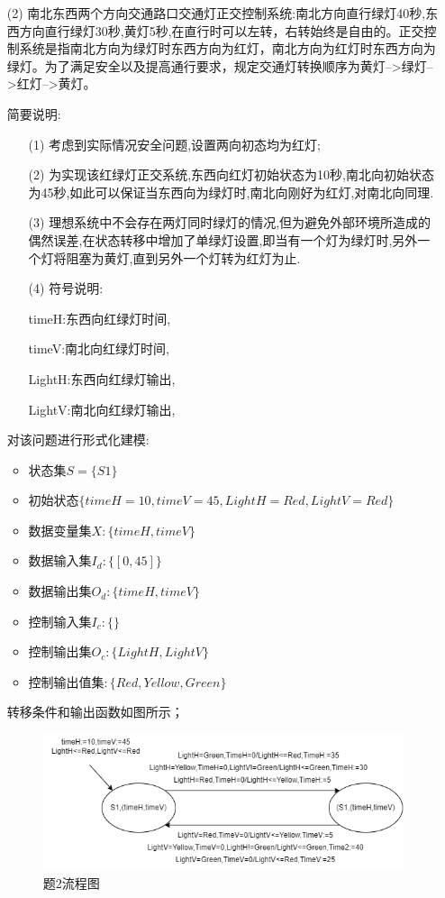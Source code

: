 \documentclass[11pt,oneside,a4paper]{article}
\begin{document}
\begin{enumerate}
    \newpage

    \item[(2)]南北东西两个方向交通路口交通灯正交控制系统:南北方向直行绿灯40秒,东西方向直行绿灯30秒,黄灯5秒,在直行时可以左转，右转始终是自由的。正交控制系统是指南北方向为绿灯时东西方向为红灯，南北方向为红灯时东西方向为绿灯。为了满足安全以及提高通行要求，规定交通灯转换顺序为黄灯-->绿灯-->红灯-->黄灯。
    
    简要说明:
    \begin{enumerate}
        \item[(1)]考虑到实际情况安全问题,设置两向初态均为红灯; 
        \item[(2)]为实现该红绿灯正交系统,东西向红灯初始状态为10秒,南北向初始状态为45秒,如此可以保证当东西向为绿灯时,南北向刚好为红灯,对南北向同理.
        \item[(3)]理想系统中不会存在两灯同时绿灯的情况,但为避免外部环境所造成的偶然误差,在状态转移中增加了单绿灯设置,即当有一个灯为绿灯时,另外一个灯将阻塞为黄灯,直到另外一个灯转为红灯为止.
        \item[(4)]符号说明:  \par
        timeH:东西向红绿灯时间,\par
        timeV:南北向红绿灯时间,\par
        LightH:东西向红绿灯输出,\par
        LightV:南北向红绿灯输出,\par
    \end{enumerate}
   
        对该问题进行形式化建模:
        \begin{itemize}
            \item 状态集$S=\{S1\}$
            \item 初始状态$\{timeH=10,timeV=45,LightH=Red,LightV=Red\}$
            \item 数据变量集$X:\{timeH,timeV\}$
            \item 数据输入集$I_d:\{  \left[ 0,45 \right]  \}$
            \item 数据输出集$O_d:\{timeH,timeV\}$
            \item 控制输入集$I_c:\{\}$
            \item 控制输出集$O_c:\{LightH,LightV\}$ 
            \item 控制输出值集$:\{Red,Yellow,Green\}$ 
            
        \end{itemize}        
        转移条件和输出函数如图所示；
        \begin{figure}[!h]
            \centering
            \includegraphics[width=1.2\textwidth]{3_2_Light.png}
            \caption{题2流程图}
        \end{figure}


\end{enumerate}
\end{document}
